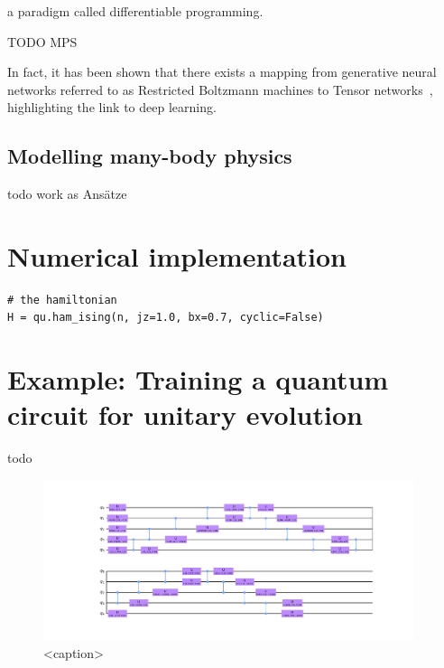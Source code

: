 a paradigm called differentiable programming.

TODO MPS


In fact, it has been shown that there exists a mapping from generative neural networks referred to as Restricted Boltzmann machines to Tensor networks~\cite{PhysRevB.97.085104}, highlighting the link to deep learning.


\subsection{Modelling many-body physics}

todo work as Ansätze


\section{Numerical implementation}




\cite{Roberts2019}


\begin{verbatim}
# the hamiltonian
H = qu.ham_ising(n, jz=1.0, bx=0.7, cyclic=False)
\end{verbatim}



\section{Example: Training a quantum circuit for unitary evolution}

todo


\begin{figure}[htb]
    \centering

    \includegraphics[width=0.97\textwidth]{figures/ansatz_circuit.pdf}

    \caption{<caption>}
    \label{fig:qasm_circuit}
\end{figure}



